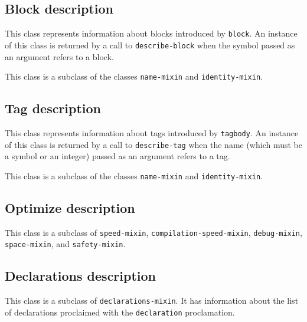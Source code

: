 \subsection{Block description}
\label{sec-instantiable-classes-block-description}

{\footnotesize
{}
}

This class represents information about blocks introduced by
\texttt{block}.  An instance of this class is returned by a call to
\texttt{describe-block} when the symbol passed as an argument refers to a
block.

This class is a subclass of the classes \texttt{name-mixin} and
\texttt{identity-mixin}.

\subsection{Tag description}
\label{sec-instantiable-classes-tag-description}

{\footnotesize
{}
}

This class represents information about tags introduced by
\texttt{tagbody}.  An instance of this class is returned by a call to
\texttt{describe-tag} when the name (which must be a symbol or an integer)
passed as an argument refers to a tag.

This class is a subclass of the classes \texttt{name-mixin} and
\texttt{identity-mixin}.

\subsection{Optimize description}
\label{sec-instantiable-classes-optimize-description}

{\footnotesize
{}
}

This class is a subclass of \texttt{speed-mixin},
\texttt{compilation-speed-mixin}, \texttt{debug-mixin},
\texttt{space-mixin}, and \texttt{safety-mixin}.

\subsection{Declarations description}
\label{sec-instantiable-classes-declarations-description}

{\footnotesize
{}
}

This class is a subclass of \texttt{declarations-mixin}.
It has information about the list of declarations proclaimed
with the \texttt{declaration} proclamation.

